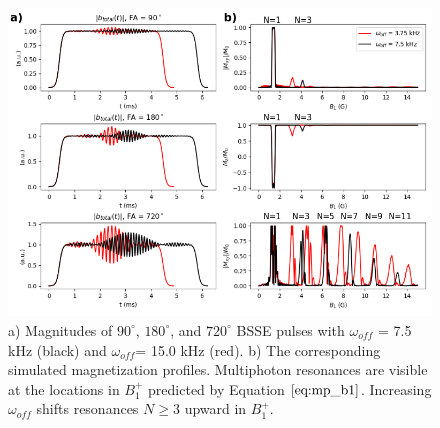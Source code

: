 \begin{figure}[h]
\centering
\includegraphics[width=1.1\textwidth]{figures/multiphoton_processed.png}
\caption{a) Magnitudes of $90^\circ$, $180^\circ$, and $720^\circ$ BSSE pulses with $\omega_{off}$ = 7.5 kHz (black) and $\omega_{off}$= 15.0 kHz (red). 
b) The corresponding simulated magnetization profiles. 
Multiphoton resonances are visible at the locations in $B_1^+$ predicted by Equation $\ref{eq:mp_b1}$. 
Increasing $\omega_{off}$ shifts resonances $N \geq 3$ upward in $B_1^+$.}
\label{fig:multiphoton}
\end{figure}



